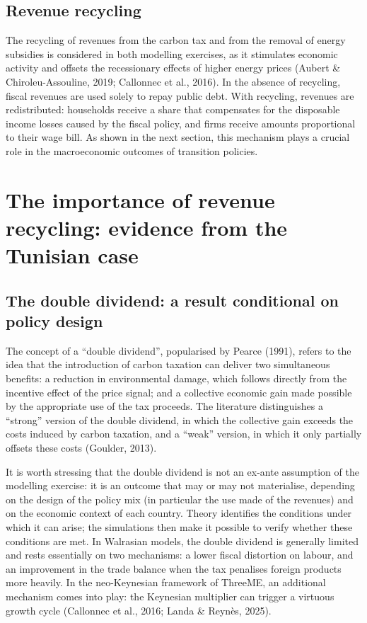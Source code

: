 \documentclass[12pt, a4paper]{article}
\begin{document}
\subsection{Revenue recycling}
\label{subsec:recycling_mechanism}

The recycling of revenues from the carbon tax and from the removal of energy subsidies is considered in both modelling exercises, as it stimulates economic activity and offsets the recessionary effects of higher energy prices (Aubert \& Chiroleu-Assouline, 2019; Callonnec et al., 2016). In the absence of recycling, fiscal revenues are used solely to repay public debt. With recycling, revenues are redistributed: households receive a share that compensates for the disposable income losses caused by the fiscal policy, and firms receive amounts proportional to their wage bill. As shown in the next section, this mechanism plays a crucial role in the macroeconomic outcomes of transition policies.

\section{The importance of revenue recycling: evidence from the Tunisian case}
\label{sec:recycling}

\subsection{The double dividend: a result conditional on policy design}

The concept of a ``double dividend'', popularised by Pearce (1991), refers to the idea that the introduction of carbon taxation can deliver two simultaneous benefits: a reduction in environmental damage, which follows directly from the incentive effect of the price signal; and a collective economic gain made possible by the appropriate use of the tax proceeds. The literature distinguishes a ``strong'' version of the double dividend, in which the collective gain exceeds the costs induced by carbon taxation, and a ``weak'' version, in which it only partially offsets these costs (Goulder, 2013).

It is worth stressing that the double dividend is not an ex-ante assumption of the modelling exercise: it is an outcome that may or may not materialise, depending on the design of the policy mix (in particular the use made of the revenues) and on the economic context of each country. Theory identifies the conditions under which it can arise; the simulations then make it possible to verify whether these conditions are met. In Walrasian models, the double dividend is generally limited and rests essentially on two mechanisms: a lower fiscal distortion on labour, and an improvement in the trade balance when the tax penalises foreign products more heavily. In the neo-Keynesian framework of ThreeME, an additional mechanism comes into play: the Keynesian multiplier can trigger a virtuous growth cycle (Callonnec et al., 2016; Landa \& Reynès, 2025).
\end{document}
